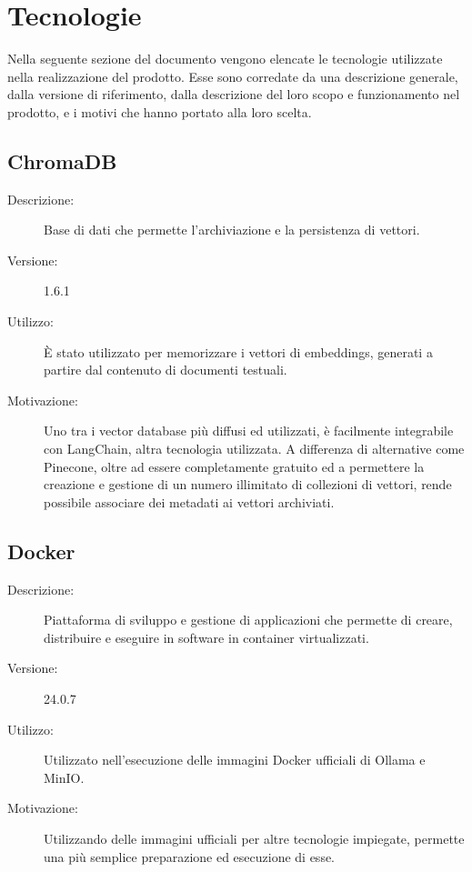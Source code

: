 \chapter{Tecnologie} \label{cap:tech}
Nella seguente sezione del documento vengono elencate le tecnologie utilizzate nella realizzazione del prodotto. Esse sono corredate da una descrizione generale, dalla versione di riferimento, dalla descrizione del loro scopo e funzionamento nel prodotto, e i motivi che hanno portato alla loro scelta.

\section{ChromaDB}
\begin{description}
\item[Descrizione:] Base di dati che permette l'archiviazione e la persistenza di vettori.
\item[Versione:] 1.6.1
\item[Utilizzo:] È stato utilizzato per memorizzare i vettori di embeddings, generati a partire dal contenuto di documenti testuali.
\item[Motivazione:] Uno tra i vector database più diffusi ed utilizzati, è facilmente integrabile con LangChain, altra tecnologia utilizzata. A differenza di alternative come Pinecone, oltre ad essere completamente gratuito ed a permettere la creazione e gestione di un numero illimitato di collezioni di vettori, rende possibile associare dei metadati ai vettori archiviati.
\end{description}

\section{Docker}
\begin{description}
\item[Descrizione:] Piattaforma di sviluppo e gestione di applicazioni che permette di creare, distribuire e eseguire in  software in container virtualizzati.
\item[Versione:] 24.0.7
\item[Utilizzo:] Utilizzato nell'esecuzione delle immagini Docker ufficiali di Ollama e MinIO.
\item[Motivazione:] Utilizzando delle immagini ufficiali per altre tecnologie impiegate, permette una più semplice preparazione ed esecuzione di esse.
\end{description}


